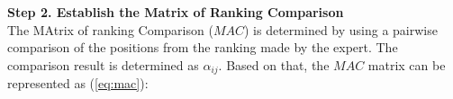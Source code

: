 




\noindent \textbf{Step 2. Establish the Matrix of Ranking Comparison} \\ 

The MAtrix of ranking Comparison ($MAC$) is determined by using a pairwise comparison of the positions from the ranking made by the expert. The comparison result is determined as $\alpha_{ij}$. Based on that, the $MAC$ matrix can be represented as (\ref{eq:mac}):

